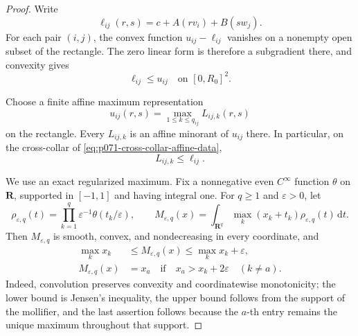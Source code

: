 \begin{proof}
Write
\[
                  \ell_{ij}(r,s)=c+A(rv_i)+B(sw_j).
\]
For each pair $(i,j)$, the convex function $u_{ij}-\ell_{ij}$ vanishes on
a nonempty open subset of the rectangle.  The zero linear form is therefore
a subgradient there, and convexity gives
\begin{equation}
                         \ell_{ij}\leq u_{ij}
                         \quad\text{on }[0,R_0]^2.
 \label{eq:p071-cross-collar-affine-minorant}
\end{equation}

Choose a finite affine maximum representation
\begin{equation}
                  u_{ij}(r,s)=\max_{1\leq k\leq q_{ij}}
                                  L_{ij,k}(r,s)
 \label{eq:p071-cross-collar-polyhedral-maximum}
\end{equation}
on the rectangle.  Every $L_{ij,k}$ is an affine minorant of $u_{ij}$
there.  In particular, on the cross-collar of
\eqref{eq:p071-cross-collar-affine-data},
\begin{equation}
                         L_{ij,k}\leq\ell_{ij}.
 \label{eq:p071-cross-collar-piece-gap}
\end{equation}

We use an exact regularized maximum.  Fix a nonnegative even
$C^\infty$ function $\theta$ on $\mathbf R$, supported in $[-1,1]$ and
having integral one.  For $q\geq1$ and $\varepsilon>0$, let
\[
 \rho_{\varepsilon,q}(t)
   =\prod_{k=1}^q\varepsilon^{-1}\theta(t_k/\varepsilon),
 \qquad
 M_{\varepsilon,q}(x)
   =\int_{\mathbf R^q}\max_k(x_k+t_k)
      \rho_{\varepsilon,q}(t)\,\mathrm dt.
\]
Then $M_{\varepsilon,q}$ is smooth, convex, and nondecreasing in every
coordinate, and
\begin{align}
 \max_kx_k&\leq M_{\varepsilon,q}(x)
       \leq\max_kx_k+\varepsilon,
 \label{eq:p071-cross-collar-regularized-max-bound}\\
 M_{\varepsilon,q}(x)&=x_a
 \quad\text{if}\quad x_a>x_k+2\varepsilon\quad(k\ne a).
 \label{eq:p071-cross-collar-regularized-max-exactness}
\end{align}
Indeed, convolution preserves convexity and coordinatewise monotonicity;
the lower bound is Jensen's inequality, the upper bound follows from the
support of the mollifier, and the last assertion follows because the
$a$-th entry remains the unique maximum throughout that support.


\end{proof}
